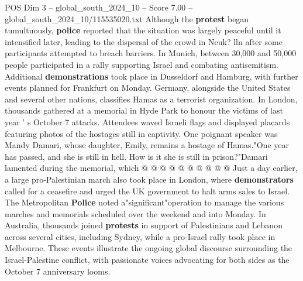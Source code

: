 \begin{textsample}{POS Dim 3 – global\_south\_2024\_10 – Score 7.00 – global\_south\_2024\_10/115535020.txt}
Although the \textbf{protest} began tumultuously, \textbf{police} reported that the situation was largely peaceful until it intensified later, leading to the dispersal of the crowd in Neuk? lln after some participants attempted to breach barriers.
In Munich, between 30,000 and 50,000 people participated in a rally supporting Israel and combating antisemitism.
Additional \textbf{demonstrations} took place in Dusseldorf and Hamburg, with further events planned for Frankfurt on Monday.
Germany, alongside the United States and several other nations, classifies Hamas as a terrorist organization.
In London, thousands gathered at a memorial in Hyde Park to honour the victims of last year ' s October 7 attacks.
Attendees waved Israeli flags and displayed placards featuring photos of the hostages still in captivity.
One poignant speaker was Mandy Damari, whose daughter, Emily, remains a hostage of Hamas."One year has passed, and she is still in hell.
How is it she is still in prison?"Damari lamented during the memorial, which @ @ @ @ @ @ @ @ @ @ Just a day earlier, a large pro-Palestinian march also took place in London, where \textbf{demonstrators} called for a ceasefire and urged the UK government to halt arms sales to Israel.
The Metropolitan \textbf{Police} noted a"significant"operation to manage the various marches and memorials scheduled over the weekend and into Monday.
In Australia, thousands joined \textbf{protests} in support of Palestinians and Lebanon across several cities, including Sydney, while a pro-Israel rally took place in Melbourne.
These events illustrate the ongoing global discourse surrounding the Israel-Palestine conflict, with passionate voices advocating for both sides as the October 7 anniversary looms.

\end{textsample}
